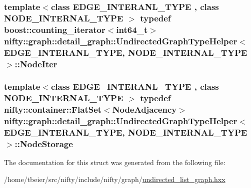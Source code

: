 \subsubsection[{Node\+Iter}]{\setlength{\rightskip}{0pt plus 5cm}template$<$class E\+D\+G\+E\+\_\+\+I\+N\+T\+E\+R\+A\+N\+L\+\_\+\+T\+Y\+P\+E , class N\+O\+D\+E\+\_\+\+I\+N\+T\+E\+R\+N\+A\+L\+\_\+\+T\+Y\+P\+E $>$ typedef boost\+::counting\+\_\+iterator$<$int64\+\_\+t$>$ {\bf nifty\+::graph\+::detail\+\_\+graph\+::\+Undirected\+Graph\+Type\+Helper}$<$ E\+D\+G\+E\+\_\+\+I\+N\+T\+E\+R\+A\+N\+L\+\_\+\+T\+Y\+P\+E, N\+O\+D\+E\+\_\+\+I\+N\+T\+E\+R\+N\+A\+L\+\_\+\+T\+Y\+P\+E $>$\+::{\bf Node\+Iter}}\label{structnifty_1_1graph_1_1detail__graph_1_1UndirectedGraphTypeHelper_a33768d5fbeda97627a0e4a67eb50776c}
\hypertarget{structnifty_1_1graph_1_1detail__graph_1_1UndirectedGraphTypeHelper_a55013bcacc1d016637b29ab2c33ac52a}{}
\subsubsection[{Node\+Storage}]{\setlength{\rightskip}{0pt plus 5cm}template$<$class E\+D\+G\+E\+\_\+\+I\+N\+T\+E\+R\+A\+N\+L\+\_\+\+T\+Y\+P\+E , class N\+O\+D\+E\+\_\+\+I\+N\+T\+E\+R\+N\+A\+L\+\_\+\+T\+Y\+P\+E $>$ typedef {\bf nifty\+::container\+::\+Flat\+Set}$<${\bf Node\+Adjacency}$>$ {\bf nifty\+::graph\+::detail\+\_\+graph\+::\+Undirected\+Graph\+Type\+Helper}$<$ E\+D\+G\+E\+\_\+\+I\+N\+T\+E\+R\+A\+N\+L\+\_\+\+T\+Y\+P\+E, N\+O\+D\+E\+\_\+\+I\+N\+T\+E\+R\+N\+A\+L\+\_\+\+T\+Y\+P\+E $>$\+::{\bf Node\+Storage}}\label{structnifty_1_1graph_1_1detail__graph_1_1UndirectedGraphTypeHelper_a55013bcacc1d016637b29ab2c33ac52a}


The documentation for this struct was generated from the following file\+:\begin{DoxyCompactItemize}
\item 
/home/tbeier/src/nifty/include/nifty/graph/\hyperlink{graph_2undirected__list__graph_8hxx}{undirected\+\_\+list\+\_\+graph.\+hxx}\end{DoxyCompactItemize}
